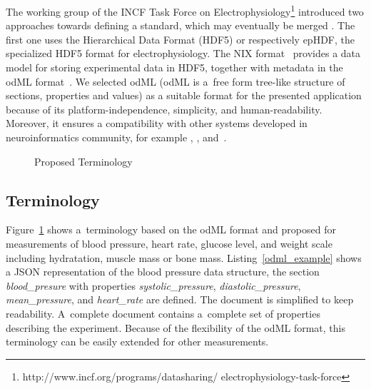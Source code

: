 \documentclass[a4paper,twoside]{article}
\begin{document}
The working group of the INCF Task Force on Electrophysiology\footnote{http://www.incf.org/programs/datasharing/ electrophysiology-task-force} introduced two approaches towards defining a standard, which may eventually be merged \cite{10.3389/conf.fninf.2013.09.00069}. The first one uses the Hierarchical Data Format (HDF5) \cite{hdf5} or respectively epHDF, the  specialized HDF5 format for electrophysiology. The NIX format~\cite{Stoewer:2014} provides a data model for storing experimental data in HDF5, together with metadata in the odML format~\cite{10.3389/fninf.2011.00016}. We selected odML (odML is a~free form tree-like structure of sections, properties and values) as a suitable format for the presented application because of its platform-independence, simplicity, and human-readability. Moreover, it ensures a compatibility with other systems developed in neuroinformatics community, for example \cite{10.3389/conf.fninf.2014.18.00029}, \cite{10.3389/conf.fninf.2014.18.00053}, and~\cite{10.3389/conf.fninf.2013.09.00025}.

\begin{figure}

  \centering
   {}
  \caption{Proposed Terminology}
  \label{fig:Terminology}
 \end{figure}


\subsection{Terminology}

Figure~\ref{fig:Terminology} shows a~terminology based on the odML format and proposed for measurements of blood pressure, heart rate, glucose level, and weight scale including hydratation, muscle mass or bone mass. Listing~\ref{odml_example} shows a JSON representation of the blood pressure data structure, the section \emph{blood\_presure} with properties \textit{systolic\_pressure}, \textit{diastolic\_pressure}, \textit{mean\_pressure}, and \textit{heart\_rate} are defined. The document is simplified to keep readability. A~complete document contains a~complete set of properties describing the experiment. Because of the flexibility of the odML format, this terminology can be easily extended for other measurements.
\end{document}
